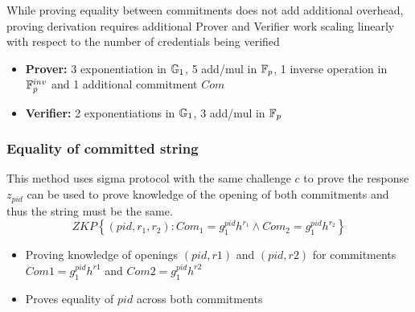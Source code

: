 While proving equality between commitments does not add additional overhead, proving derivation requires additional Prover and Verifier work scaling linearly with respect to the number of credentials being verified
\begin{itemize}
    \item \textbf{Prover:} 3 exponentiation in $\mathbb{G}_1$, 5 add/mul in $\mathbb{F}_p$, 1 inverse operation in $\mathbb{F}_p^{inv}$ and 1 additional commitment $Com$
    \item \textbf{Verifier:} 2 exponentiations in $\mathbb{G}_1$, 3 add/mul in $\mathbb{F}_p$
\end{itemize}

\subsubsection{Equality of committed string}
This method uses sigma protocol with the same challenge $c$ to prove the response $z_{pid}$ can be used to prove knowledge of the opening of both commitments and thus the string must be the same.
\[
ZKP
    \left\{ 
    (pid, r_1, r_2): Com_1 = g_1^{pid} h^{r_1} \wedge Com_2 = g_1^{pid} h^{r_2}
    \right\}
\]


\begin{itemize}
    \item Proving knowledge of openings $(pid, r1)$ and $(pid, r2)$ for commitments $Com1 = g_1^{pid}h^{r1}$ and $Com2 = g_1^{pid}h^{r2}$
    \item Proves equality of $pid$ across both commitments
\end{itemize}



